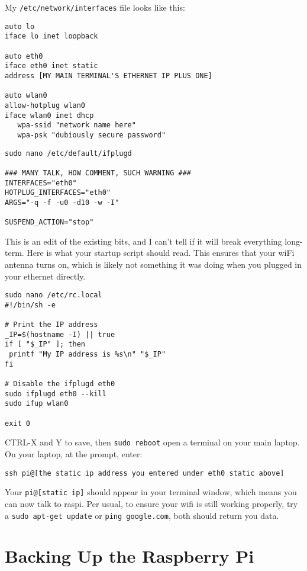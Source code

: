 My \texttt{/etc/network/interfaces} file looks like this:
\begin{lstlisting}
auto lo
iface lo inet loopback

auto eth0
iface eth0 inet static
address [MY MAIN TERMINAL'S ETHERNET IP PLUS ONE]

auto wlan0
allow-hotplug wlan0
iface wlan0 inet dhcp
   wpa-ssid "network name here"
   wpa-psk "dubiously secure password"
\end{lstlisting}
 

\begin{lstlisting}
sudo nano /etc/default/ifplugd

### MANY TALK, HOW COMMENT, SUCH WARNING ###
INTERFACES="eth0"
HOTPLUG_INTERFACES="eth0"
ARGS="-q -f -u0 -d10 -w -I"

SUSPEND_ACTION="stop"
\end{lstlisting}

This is an edit of the existing bits, and I can't tell if it will break everything long-term.
Here is what your startup script should read. This ensures that your wiFi antenna turns on, which is likely not something it was doing when you plugged in your ethernet directly.

\begin{lstlisting}
sudo nano /etc/rc.local
#!/bin/sh -e

# Print the IP address
_IP=$(hostname -I) || true
if [ "$_IP" ]; then
 printf "My IP address is %s\n" "$_IP"
fi

# Disable the ifplugd eth0
sudo ifplugd eth0 --kill
sudo ifup wlan0

exit 0
\end{lstlisting}

CTRL-X and Y to save, then \texttt{sudo reboot} open a terminal on your main laptop. On your laptop, at the prompt, enter:
\begin{lstlisting}
ssh pi@[the static ip address you entered under eth0 static above]
\end{lstlisting}

Your \texttt{pi@[static ip]} should appear in your terminal window, which means you can now talk to raspi.
Per usual, to ensure your wifi is still working properly, try a \texttt{sudo apt-get update} or \texttt{ping google.com}, both should return you data.

\section{Backing Up the Raspberry Pi}

